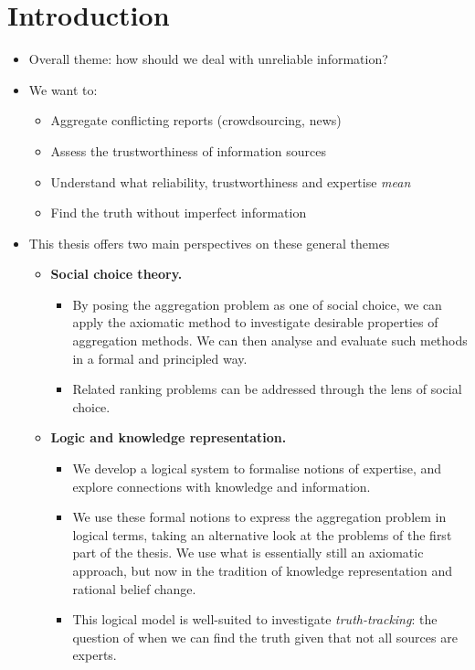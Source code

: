 \chapter{Introduction}

\begin{notes}
    \begin{itemize}
        \item Overall theme: how should we deal with unreliable information?
        \item We want to:
        \begin{itemize}
            \item Aggregate conflicting reports (crowdsourcing, news)
            \item Assess the trustworthiness of information sources
            \item Understand what reliability, trustworthiness and expertise
                  \emph{mean}
            \item Find the truth without imperfect information
        \end{itemize}
        \item This thesis offers two main perspectives on these general themes
        \begin{itemize}
            \item \textbf{Social choice theory.}
            \begin{itemize}
                \item By posing the aggregation problem as one of social
                      choice, we can apply the axiomatic method to investigate
                      desirable properties of aggregation methods. We can then
                      analyse and evaluate such methods in a formal and
                      principled way.
                \item Related ranking problems can be addressed through the
                      lens of social choice.
            \end{itemize}
            \item \textbf{Logic and knowledge representation.}
            \begin{itemize}
                \item We develop a logical system to formalise notions of
                      expertise, and explore connections with knowledge and
                      information.
                \item We use these formal notions to express the aggregation
                      problem in logical terms, taking an alternative look at
                      the problems of the first part of the thesis. We use what
                      is essentially still an axiomatic approach, but now in
                      the tradition of knowledge representation and rational
                      belief change.
                \item This logical model is well-suited to investigate
                      \emph{truth-tracking}: the question of when we can find
                      the truth given that not all sources are experts.
            \end{itemize}
        \end{itemize}


\end{itemize}
\end{notes}
